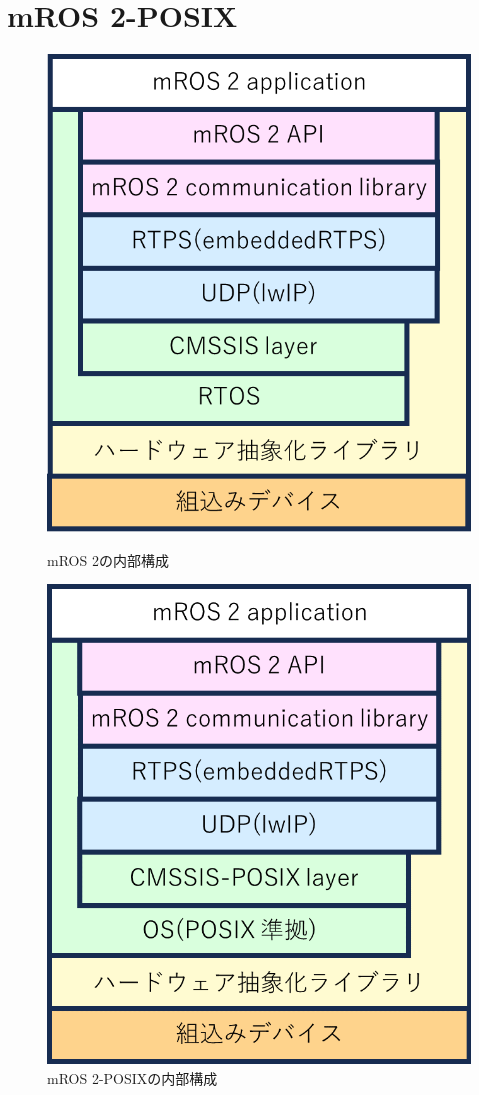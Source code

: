 \section{mROS 2-POSIX}
\begin{figure}[ht]
    \centering
    \begin{minipage}{.48\textwidth}
        \centering
        \includegraphics[width=0.9\linewidth]{images/fig1_mros2_b.png}
        \caption{mROS 2の内部構成}
        \label{fig:subfig_a}
    \end{minipage}
    \hfill
    \begin{minipage}{.48\textwidth}
        \centering
        \includegraphics[width=0.9\linewidth]{images/fig1_mros2posix_a.png}
        \caption{mROS 2-POSIXの内部構成}
        \label{fig:subfig_b}
    \end{minipage}
\end{figure}
